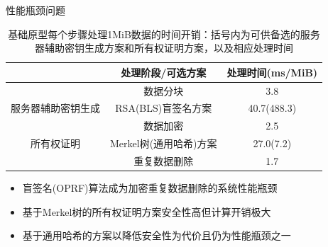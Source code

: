 \documentclass{beamer}
\begin{document}
\begin{frame}{性能瓶颈问题}
    \begin{table}[!htb]
        \small
        \centering
        \caption{基础原型每个步骤处理1MiB数据的时间开销：括号内为可供备选的服务器辅助密钥生成方案和所有权证明方案，以及相应处理时间}
        \label{tab:intro-bottleneck}
        \begin{tabular}{@{}ccc@{}}
            \toprule
                                        & 处理阶段/可选方案      & 处理时间(ms/MiB) \\ \midrule
                                        & 数据分块               & 3.8              \\
            服务器辅助密钥生成          & {\color{red} RSA(BLS)盲签名方案}     & {\color{red} 40.7(488.3)}      \\
            \multirow{3}{*}{所有权证明} & 数据加密               & 2.5              \\
                                        & {\color{red} Merkel树(通用哈希)方案} & {\color{red} 27.0(7.2)}        \\
                                        & 重复数据删除           & 1.7              \\ \bottomrule
        \end{tabular}
    \end{table}
    \begin{itemize}
        \item 盲签名(OPRF)算法成为加密重复数据删除的系统性能瓶颈
        \item 基于Merkel树的所有权证明方案安全性高但计算开销极大
        \item 基于通用哈希的方案以降低安全性为代价且仍为性能瓶颈之一
    \end{itemize}
\end{frame}
\end{document}
